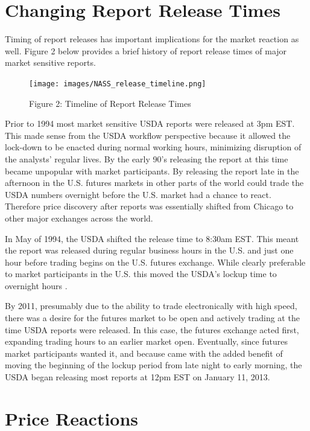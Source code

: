 \documentclass[
]{book}
\begin{document}
\hypertarget{changing-report-release-times}{%
\section{Changing Report Release Times}\label{changing-report-release-times}}

Timing of report releases has important implications for the market reaction as well. Figure 2 below provides a brief history of report release times of major market sensitive reports.

\begin{figure}
\centering
\texttt{[image: images/NASS\_release\_timeline.png]}
\caption{Figure 2: Timeline of Report Release Times}
\end{figure}

Prior to 1994 most market sensitive USDA reports were released at 3pm EST. This made sense from the USDA workflow perspective because it allowed the lock-down to be enacted during normal working hours, minimizing disruption of the analysts' regular lives. By the early 90's releasing the report at this time became unpopular with market participants. By releasing the report late in the afternoon in the U.S. futures markets in other parts of the world could trade the USDA numbers overnight before the U.S. market had a chance to react. Therefore price discovery after reports was essentially shifted from Chicago to other major exchanges across the world.

In May of 1994, the USDA shifted the release time to 8:30am EST. This meant the report was released during regular business hours in the U.S. and just one hour before trading begins on the U.S. futures exchange. While clearly preferable to market participants in the U.S. this moved the USDA's lockup time to overnight hours \citep{allen_safeguarding_2007}.

By 2011, presumably due to the ability to trade electronically with high speed, there was a desire for the futures market to be open and actively trading at the time USDA reports were released. In this case, the futures exchange acted first, expanding trading hours to an earlier market open. Eventually, since futures market participants wanted it, and because came with the added benefit of moving the beginning of the lockup period from late night to early morning, the USDA began releasing most reports at 12pm EST on January 11, 2013.

\hypertarget{price-reactions}{%
\section{Price Reactions}\label{price-reactions}}
\end{document}
